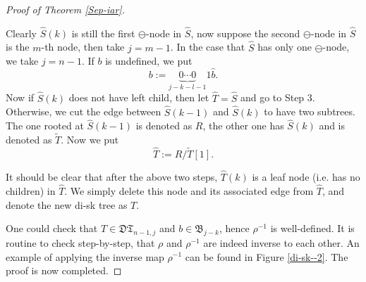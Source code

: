 \documentclass[11pt,reqno]{amsart}
\numberwithin{equation}{section}
\theoremstyle{plain}
\theoremstyle{definition}
\newcommand{\I}{\mathfrak{B}}
\begin{document}
\begin{proof}[Proof of Theorem \ref{Sep-iar}]
\begin{description}
\begin{description}
\begin{itemize}
        \end{itemize}
    \end{description}
    \item[Step 2] Clearly $\hat{S}(k)$ is still the first $\ominus$-node in $\hat{S}$, now suppose the second $\ominus$-node in $\hat{S}$ is the $m$-th node, then take $j=m-1$. In the case that $\hat{S}$ has only one $\ominus$-node, we take $j=n-1$. If $b$ is undefined, we put $$b:=\underbrace{0\cdots 0}_{j-k-l-1}1\hat{b}.$$ Now if $\hat{S}(k)$ does not have left child, then let $\hat{T}=\hat{S}$ and go to Step 3. Otherwise, we cut the edge between $\hat{S}(k-1)$ and $\hat{S}(k)$ to have two subtrees. The one rooted at $\hat{S}(k-1)$ is denoted as $R$, the other one has $\hat{S}(k)$ and is denoted as $\tilde{T}$. Now we put $$\hat{T}:=R\slash\tilde{T}[1].$$
    \item[Step 3] It should be clear that after the above two steps, $\hat{T}(k)$ is a leaf node (i.e. has no children) in $\hat{T}$. We simply delete this node and its associated edge from $\hat{T}$, and denote the new di-sk tree as $T$.
\end{description}

One could check that $T\in\mathfrak{DT}_{n-1,j}$ and $b\in\I_{j-k}$, hence $\rho^{-1}$ is well-defined. It is routine to check step-by-step, that $\rho$ and $\rho^{-1}$ are indeed inverse to each other. An example of applying the inverse map $\rho^{-1}$ can be found in Figure \ref{di-sk--2}. The proof is now completed.
\end{proof}
\end{document}
